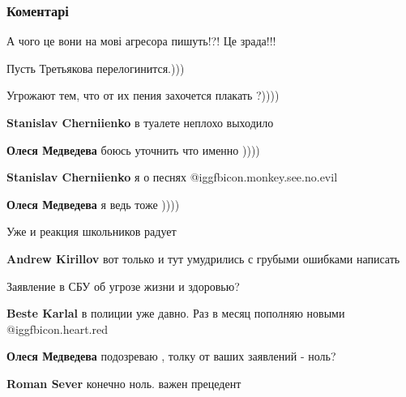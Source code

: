  
 
 
 
 
\subsubsection{Коментарі}
\label{sec:15_10_2021.fb.medvedeva_olesja.1.shkolniki_obida_bandera.cmt}

\begin{itemize} %
А чого це вони на мові агресора пишуть!?! Це зрада!!!

Пусть Третьякова перелогинится.)))

Угрожают тем, что от их пения захочется плакать ?))))

\begin{itemize} %
\textbf{Stanislav Cherniienko} в туалете неплохо выходило

\textbf{Олеся Медведева} боюсь уточнить что именно ))))

\textbf{Stanislav Cherniienko} я о песнях @igg{fbicon.monkey.see.no.evil} 

\textbf{Олеся Медведева} я ведь тоже ))))
\end{itemize} %

Уже и реакция школьников радует

\begin{itemize} %
\textbf{Andrew Kirillov} вот только и тут умудрились с грубыми ошибками написать
\end{itemize} %

Заявление в СБУ об угрозе жизни и здоровью?

\begin{itemize} %
\textbf{Beste Karlal} в полиции уже давно. Раз в месяц пополняю новыми  @igg{fbicon.heart.red}

\textbf{Олеся Медведева} подозреваю , толку от ваших заявлений - ноль?

\textbf{Roman Sever} конечно ноль. важен прецедент


\end{itemize}
\end{itemize}
